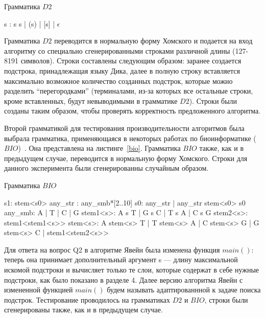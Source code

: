 \documentclass[14pt]{matmex-diploma-custom}
\begin{document}
\begin{listing}
\caption{Грамматика $D2$}

\quad\quad\quad\quad\quad\quad\quad\quad\quad\quad\quad\quad s : s s  |  (s) |  [s]  |  $\epsilon$

\label{dyck}
\end{listing} 

Грамматика $D2$ переводится в нормальную форму Хомского и подается на вход алгоритму со специально сгенерированными строками различной длины (127-8191 символов). Строки составлены следующим образом: заранее создается подстрока, принадлежащая языку Дика, далее в полную строку вставляется максимально возможное количество созданных подстрок, которые можно разделить “перегородками” (терминалами, из-за которых все остальные строки, кроме вставленных, будут невыводимыми в грамматике $D2$). Строки были созданы таким образом, чтобы проверять корректность предложенного алгоритма.

Второй грамматикой для тестирования производительности алгоритмов была выбрала грамматика, применяющаяся в некоторых работах по биоинформатике ($BIO$)~\cite{bioinformatics19}. Она представлена на листинге~\ref{bio}. Грамматика $BIO$ также, как и в предыдущем случае, переводится в нормальную форму Хомского. Строки для данного эксперимента были сгенерированны случайным образом.

\begin{listing}[h]
\caption{Грамматика $BIO$}
\begin{pyglist}[]
            s1: stem<s0>
            any_str : any_smb*[2..10]
            s0: any_str | any_str stem<s0> s0
            any_smb: A | T | C | G
            stem1<s>: A s T | G s C | T s A | C s G 
            stem2<s>: stem1<stem1<s>>
            stem<s>:  
                  A stem<s> T 
                | T stem<s> A 
                | C stem<s> G 
                | G stem<s> C 
                | stem1<stem2<s>>  
\end{pyglist}
\label{bio}
\end{listing}


Для ответа на вопрос Q2 в алгоритме Явейн была изменена функция $main()$: теперь она принимает дополнительный аргумент s --- длину максимальной искомой подстроки и вычисляет только те слои, которые содержат в себе нужные подстроки, как было показано в разделе 4. Далее версию алгоритма Явейн с измененной функцией $main()$ будем называть адаптированнной к задаче поиска подстрок. Тестирование проводилось на грамматиках $D2$ и $BIO$, строки были сгенерированы также, как и в предыдущем случае.
\end{document}
